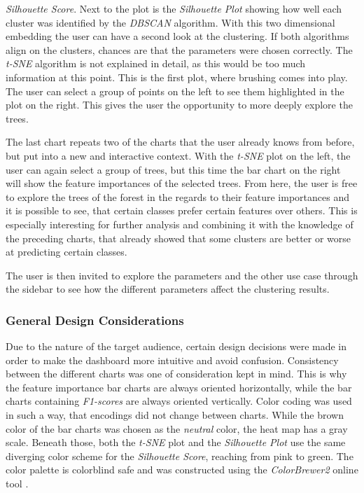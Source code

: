 \documentclass[a4paper, 12pt]{article}
\begin{document}
\textit{Silhouette Score}. Next to the plot is the \textit{Silhouette Plot} showing how well each
cluster was identified by the \textit{DBSCAN} algorithm. With this two dimensional embedding the user
can have a second look at the clustering. If both algorithms align
on the clusters, chances are that the parameters were chosen correctly. The \textit{t-SNE} algorithm
is not explained in detail, as this would be too much information at this point.
This is the first plot, where brushing comes into play. The user can select a group of points on the
left to see them highlighted in the plot on the right. This gives the user the opportunity to more
deeply explore the trees. \par
The last chart repeats two of the charts that the user already knows from before, but put into a new
and interactive context. With the \textit{t-SNE} plot on the left, the user can again select a group
of trees, but this time the bar chart on the right will show the feature importances of the selected
trees. From here, the user is free to explore the trees of the forest in the regards to their
feature importances and it is possible to see, that certain classes prefer certain features over
others. This is especially interesting for further analysis and combining it with the knowledge of
the preceding charts, that already showed that some clusters are better or worse at predicting certain
classes. \par
The user is then invited to explore the parameters and the other use case through the sidebar to see
how the different parameters affect the clustering results.

\subsubsection{General Design Considerations}
Due to the nature of the target audience, certain design decisions were made in order to make the
dashboard more intuitive and avoid confusion. Consistency between the different charts was one of
consideration kept in mind. This is why the feature importance bar charts are always oriented
horizontally, while the bar charts containing \textit{F1-scores} are always oriented vertically.
Color coding was used in such a way, that encodings did not change between charts. While the brown
color of the bar charts was chosen as the \textit{neutral} color, the heat map has a gray scale.
Beneath those, both the \textit{t-SNE} plot and the \textit{Silhouette Plot} use the same diverging
color scheme for the \textit{Silhouette Score}, reaching from pink to green. The color palette is
colorblind safe and was constructed using the \textit{ColorBrewer2} \cite{brewer1994guidelines}
online tool \cite{harrower2003colorbrewer}.
\end{document}
